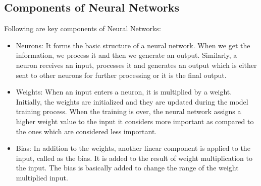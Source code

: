 \subsection{Components of Neural Networks}
Following are key components of Neural Networks:
\begin{itemize}
    \item Neurons: It forms the basic structure of a neural network. When we get the information, we process it and then we generate an output. Similarly, a neuron receives an input, processes it and generates an output which is either sent to other neurons for further processing or it is the final output.
    \item Weights: When an input enters a neuron, it is multiplied by a weight. Initially, the weights are initialized and they are updated during the model training process. When the training is over, the neural network assigns a higher weight value to the input it considers more important as compared to the ones which are considered less important.
    \item Bias: In addition to the weights, another linear component is applied to the input, called as the bias. It is added to the result of weight multiplication to the input. The bias is basically added to change the range of the weight multiplied input.
\end{itemize}

